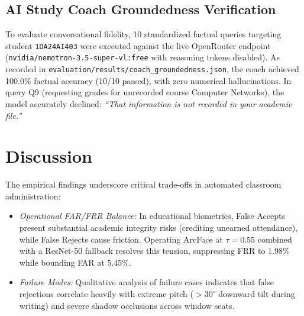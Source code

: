 \documentclass[conference]{IEEEtran}
\begin{document}
\subsection{AI Study Coach Groundedness Verification}
To evaluate conversational fidelity, 10 standardized factual queries targeting student \texttt{1DA24AI403} were executed against the live OpenRouter endpoint (\texttt{nvidia/nemotron-3.5-super-vl:free} with reasoning tokens disabled). As recorded in \texttt{evaluation/results/coach\_groundedness.json}, the coach achieved 100.0\% factual accuracy (10/10 passed), with zero numerical hallucinations. In query Q9 (requesting grades for unrecorded course Computer Networks), the model accurately declined: \textit{``That information is not recorded in your academic file.''}

\section{Discussion}
The empirical findings underscore critical trade-offs in automated classroom administration:
\begin{itemize}
    \item \textit{Operational FAR/FRR Balance:} In educational biometrics, False Accepts present substantial academic integrity risks (crediting unearned attendance), while False Rejects cause friction. Operating ArcFace at $\tau=0.55$ combined with a ResNet-50 fallback resolves this tension, suppressing FRR to 1.98\% while bounding FAR at 5.45\%.
    \item \textit{Failure Modes:} Qualitative analysis of failure cases indicates that false rejections correlate heavily with extreme pitch ($>30^\circ$ downward tilt during writing) and severe shadow occlusions across window seats.
\end{itemize}
\end{document}
